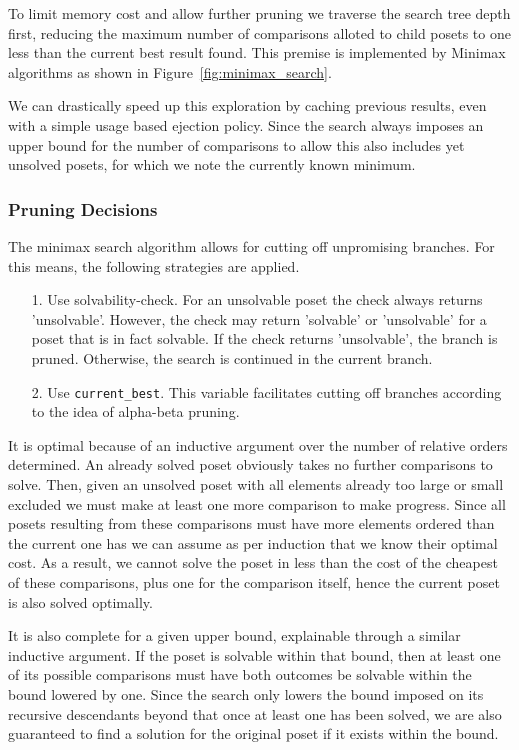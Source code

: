 \documentclass[10pt,journal,compsoc]{IEEEtran}
\begin{document}
To limit memory cost and allow further pruning we traverse the search tree depth first, reducing the maximum number of comparisons alloted to child posets to one less than the current best result found.
This premise is implemented by Minimax algorithms as shown in Figure~\ref{fig:minimax_search}.

We can drastically speed up this exploration by caching previous results, even with a simple usage based ejection policy. Since the search always imposes an upper bound for the number of comparisons to allow this also includes yet unsolved posets, for which we note the currently known minimum.

\subsubsection{Pruning Decisions}
The minimax search algorithm allows for cutting off unpromising branches.
For this means, the following strategies are applied.

\begin{enumerate}
  \item[1.]
    Use solvability-check. For an unsolvable poset the check always returns 'unsolvable'.
    However, the check may return 'solvable' or 'unsolvable' for a poset that is in fact solvable.
    If the check returns 'unsolvable', the branch is pruned.
    Otherwise, the search is continued in the current branch.
  \item[2.]
    Use \texttt{current\_best}. This variable facilitates cutting off branches according to the idea of alpha-beta pruning.
\end{enumerate}

It is optimal because of an inductive argument over the number of relative orders determined.
An already solved poset obviously takes no further comparisons to solve.
Then, given an unsolved poset with all elements already too large or small excluded we must make at least one more comparison to
make progress.
Since all posets resulting from these comparisons must have more elements ordered than the current one has we can assume as per induction that we know their optimal cost.
As a result, we cannot solve the poset in less than the cost of the cheapest of these comparisons, plus one for the comparison itself, hence the current poset is also solved optimally.

It is also complete for a given upper bound, explainable through a similar inductive argument.
If the poset is solvable within that bound, then at least one of its possible comparisons must have both outcomes be solvable within the bound lowered by one.
Since the search only lowers the bound imposed on its recursive descendants beyond that once at least one has been solved, we are also guaranteed to find a solution for the original poset if it exists within the bound.
\end{document}
